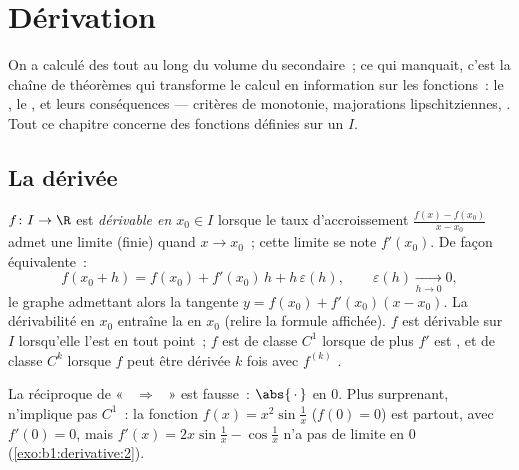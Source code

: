 \chapter{Dérivation}\label{ch:b1:derivative}

On a calculé des  tout au long du volume du secondaire~; ce qui
manquait, c'est la chaîne de théorèmes qui transforme le calcul en
information sur les fonctions~: le , le , et leurs conséquences --- critères de monotonie,
majorations lipschitziennes, . Tout ce chapitre concerne des
fonctions définies sur un  $I$.

\section{La dérivée}

\begin{definition}\label{def:b1:derivative:def}
$f \colon I \to \R$ est \emph{dérivable en $x_0 \in
I$} lorsque le taux d'accroissement
$\frac{f(x) - f(x_0)}{x - x_0}$ admet une limite (finie) quand $x \to x_0$~;
cette limite se note $f'(x_0)$. De façon équivalente~:
\[
f(x_0 + h) = f(x_0) + f'(x_0)\,h + h\,\varepsilon(h),
\qquad \varepsilon(h) \xrightarrow[h \to 0]{} 0 ,
\]
le graphe admettant alors la tangente $y = f(x_0) + f'(x_0)(x -
x_0)$. La dérivabilité en $x_0$ entraîne la  en $x_0$ (relire
la formule affichée). $f$ est dérivable sur $I$ lorsqu'elle l'est en tout point~;
$f$ est de classe $C^1$ lorsque de plus $f'$ est , et de
classe $C^k$ lorsque $f$ peut être
dérivée $k$ fois avec $f^{(k)}$ .
\end{definition}

\begin{example}\label{ex:b1:derivative:notc1}
La réciproque de «~ $\Rightarrow$ ~» est fausse~:
$\abs{\,\cdot\,}$ en $0$. Plus surprenant,  n'implique pas
$C^1$~: la fonction $f(x) = x^2 \sin\frac 1x$ ($f(0) = 0$) est
 partout, avec $f'(0) = 0$, mais $f'(x) = 2x
\sin\frac1x - \cos\frac 1x$ n'a pas de limite en $0$
(\cref{exo:b1:derivative:2}).
\end{example}

